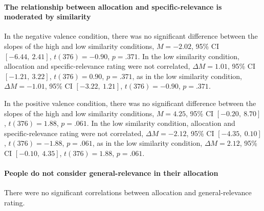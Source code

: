 \documentclass[a4paper, nobind, dvipsnames]{templates/ociamthesis}
\newcommand*{\bibtitle}{References}
\theoremstyle{definition}
\theoremstyle{definition}
\theoremstyle{definition}
\theoremstyle{definition}
\theoremstyle{remark}
\begin{document}
\paragraph{The relationship between allocation and specific-relevance is moderated by similarity}

In the negative valence condition, there was no significant difference between
the slopes of the high and low similarity conditions,
\(M = -2.02\), 95\% CI \([-6.44,~2.41]\), \(t(376) = -0.90\), \(p = .371\).
In the low similarity condition, allocation and specific-relevance rating were
not correlated,
\(\Delta M = 1.01\), 95\% CI \([-1.21,~3.22]\), \(t(376) = 0.90\), \(p = .371\),
as in the low similarity condition,
\(\Delta M = -1.01\), 95\% CI \([-3.22,~1.21]\), \(t(376) = -0.90\), \(p = .371\).

In the positive valence condition, there was no significant difference between
the slopes of the high and low similarity conditions,
\(M = 4.25\), 95\% CI \([-0.20,~8.70]\), \(t(376) = 1.88\), \(p = .061\).
In the low similarity condition, allocation and specific-relevance rating were
not correlated,
\(\Delta M = -2.12\), 95\% CI \([-4.35,~0.10]\), \(t(376) = -1.88\), \(p = .061\),
as in the low similarity condition,
\(\Delta M = 2.12\), 95\% CI \([-0.10,~4.35]\), \(t(376) = 1.88\), \(p = .061\).

\paragraph{People do not consider general-relevance in their allocation}

There were no significant correlations between allocation and general-relevance
rating.




\setlength{\baselineskip}{0pt} %

{\renewcommand*\MakeUppercase[1]{#1}%
\printbibliography[heading=bibintoc,title={\bibtitle}]}
\end{document}
